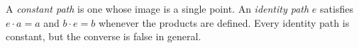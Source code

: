 A \textit{constant path} is one whose image is a single point. An \textit{identity path} $e$ satisfies $e \cdot a = a$ and $b \cdot e = b$ whenever the products are defined. Every identity path is constant, but the converse is false in general.
